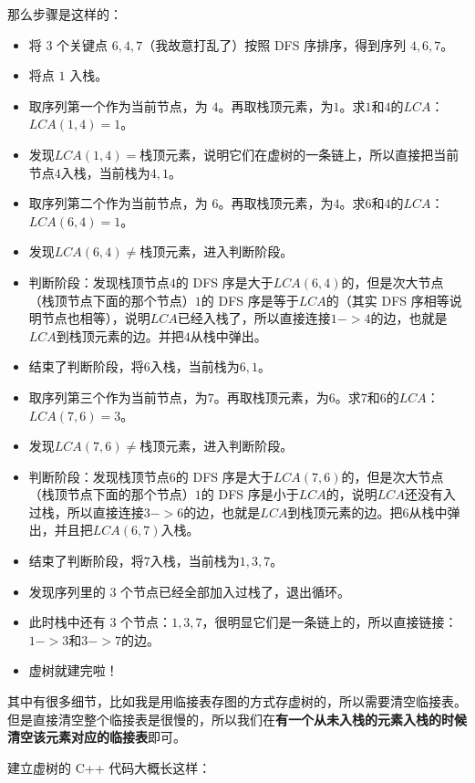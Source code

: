 那么步骤是这样的：

\begin{itemize}
\item 将 3 个关键点 $6,4,7$（我故意打乱了）按照 DFS 序排序，得到序列 $4,6,7$。
\item 将点 $1$ 入栈。
\item 取序列第一个作为当前节点，为 $4$。再取栈顶元素，为$1$。求$1$和$4$的$LCA$：$LCA(1,4)=1$。
\item 发现$LCA(1,4)=$栈顶元素，说明它们在虚树的一条链上，所以直接把当前节点$4$入栈，当前栈为$4,1$。
\item 取序列第二个作为当前节点，为 $6$。再取栈顶元素，为$4$。求$6$和$4$的$LCA$：$LCA(6,4)=1$。
\item 发现$LCA(6,4)\neq$栈顶元素，进入判断阶段。
\item 判断阶段：发现栈顶节点$4$的 DFS 序是大于$LCA(6,4)$的，但是次大节点（栈顶节点下面的那个节点）$1$的 DFS 序是等于$LCA$的（其实 DFS 序相等说明节点也相等），说明$LCA$已经入栈了，所以直接连接$1->4$的边，也就是$LCA$到栈顶元素的边。并把$4$从栈中弹出。
\item 结束了判断阶段，将$6$入栈，当前栈为$6,1$。
\item 取序列第三个作为当前节点，为$7$。再取栈顶元素，为$6$。求$7$和$6$的$LCA$：$LCA(7,6)=3$。
\item 发现$LCA(7,6)\neq$栈顶元素，进入判断阶段。
\item 判断阶段：发现栈顶节点$6$的 DFS 序是大于$LCA(7,6)$的，但是次大节点（栈顶节点下面的那个节点）$1$的 DFS 序是小于$LCA$的，说明$LCA$还没有入过栈，所以直接连接$3->6$的边，也就是$LCA$到栈顶元素的边。把$6$从栈中弹出，并且把$LCA(6,7)$入栈。
\item 结束了判断阶段，将$7$入栈，当前栈为$1,3,7$。
\item 发现序列里的 3 个节点已经全部加入过栈了，退出循环。
\item 此时栈中还有 3 个节点：$1, 3,7$，很明显它们是一条链上的，所以直接链接：$1->3$和$3->7$的边。
\item 虚树就建完啦！
\end{itemize}

其中有很多细节，比如我是用临接表存图的方式存虚树的，所以需要清空临接表。但是直接清空整个临接表是很慢的，所以我们在\textbf{有一个从未入栈的元素入栈的时候清空该元素对应的临接表}即可。

建立虚树的 C++ 代码大概长这样：

